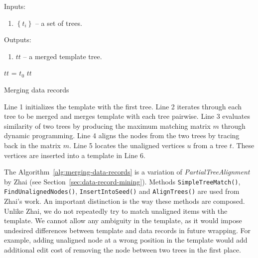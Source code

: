 Inputs: 

\begin{enumerate}
	\item $\left\{t_i\right\}$ -- a set of trees.
\end{enumerate}

Outputs: 

\begin{enumerate}
	\item $tt$ -- a merged template tree.
\end{enumerate}


\IncMargin{2em}
\begin{algorithm}[h]

	\DontPrintSemicolon

	\BlankLine

	$tt$ = $t_0$ \;
	\Return $tt$ \;

	\caption{Merging data records}
	\label{alg:merging-data-records}

\end{algorithm}
\DecMargin{2em}

Line 1 initializes the template with the first tree. Line 2 iterates through each tree to be merged and merges template with each tree pairwise. Line 3 evaluates similarity of two trees by producing the maximum matching matrix $m$ through dynamic programming. Line 4 aligns the nodes from the two trees by tracing back in the matrix $m$. Line 5 locates the unaligned vertices $u$ from a tree $t$. These vertices are inserted into a template in Line 6.

The Algorithm~\ref{alg:merging-data-records} is a variation of \emph{PartialTreeAlignment} by Zhai \cite{zhai2005a} (see Section~\ref{sec:data-record-mining}). Methods \texttt{SimpleTreeMatch()}, \texttt{FindUnalignedNodes()}, \texttt{InsertIntoSeed()} and \texttt{AlignTrees()} are used from Zhai's work. An important distinction is the way these methods are composed. Unlike Zhai, we do not repeatedly try to match unaligned items with the template. We cannot allow any ambiguity in the template, as it would impose undesired differences between template and data records in future wrapping. For example, adding unaligned node at a wrong position in the template would add additional edit cost of removing the node between two trees in the first place.

